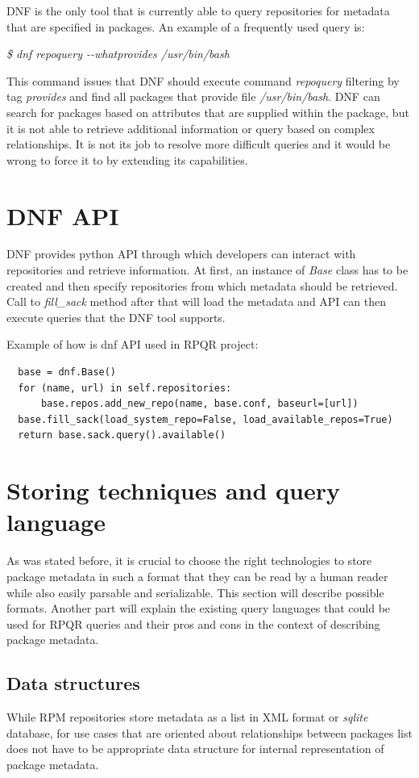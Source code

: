 DNF is the only tool that is currently able to query repositories for metadata that are specified
in packages. An example of a frequently used query is:

\textit{\$ dnf repoquery -{}-whatprovides /usr/bin/bash}

This command issues that DNF should execute command \textit{repoquery} filtering by tag \mbox{\textit{provides}}
and find all packages that provide file \textit{/usr/bin/bash}. DNF can search for packages based on
attributes that are supplied within the package, but it is not able to retrieve additional information
or query based on complex relationships. It is not its job to resolve more difficult queries and
it would be wrong to force it to by extending its capabilities.

\section{DNF API}
DNF provides python API through which developers can interact with repositories and retrieve information.
At first, an instance of \textit{Base} class has to be created and then specify repositories from which
metadata should be retrieved. Call to \textit{fill\_sack} method after that will load the metadata
and API can then execute queries that the DNF tool supports.

Example of how is dnf API used in RPQR project:
\begin{lstlisting}
  base = dnf.Base()
  for (name, url) in self.repositories:
      base.repos.add_new_repo(name, base.conf, baseurl=[url])
  base.fill_sack(load_system_repo=False, load_available_repos=True)
  return base.sack.query().available()
\end{lstlisting}

\section{Storing techniques and query language}
As was stated before, it is crucial to choose the right technologies to store package metadata in
such a format that they can be read by a human reader while also easily parsable and serializable.
This section will describe possible formats. Another part will explain the existing query
languages that could be used for RPQR queries and their pros and cons in the context of describing
package metadata.

\subsection*{Data structures}
While RPM repositories store metadata as a list in XML format or \textit{sqlite} database, for use cases that
are oriented about relationships between packages list does not have to be appropriate data
structure for internal representation of package metadata.

